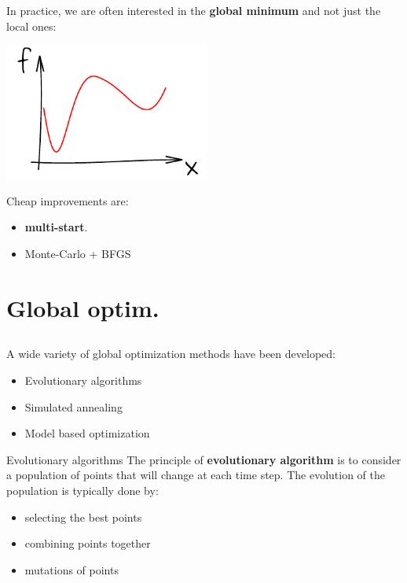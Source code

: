 \documentclass{beamer}
\begin{document}
\begin{frame}{}
In practice, we are often interested in the \textbf{global minimum} and not just the local ones:
\begin{center}
\includegraphics[height=4.5cm]{figures/ink_f}
\end{center}
Cheap improvements are: 
\begin{itemize}
 	\item \textbf{multi-start}.
 	\item Monte-Carlo + BFGS
\end{itemize} 
\end{frame}

\section{Global optim.}
\subsection{}

\begin{frame}{}
A wide variety of global optimization methods have been developed:
\begin{itemize}
	\item Evolutionary algorithms
	\item Simulated annealing
	\item Model based optimization
\end{itemize}
\end{frame}

\begin{frame}{Evolutionary algorithms}
The principle of \textbf{evolutionary algorithm} is to consider a population of points that will change at each time step. The evolution of the population is typically done by:
\begin{itemize}
	\item selecting the best points
	\item combining points together
	\item mutations of points
\end{itemize}
\end{frame}
\end{document}

